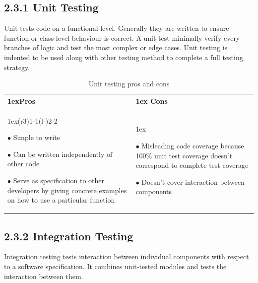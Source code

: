 \documentclass[12pt]{report}
\begin{document}
\subsection*{2.3.1 Unit Testing}
\par\noindent
Unit tests code on a functional-level. Generally they are written to ensure function or class-level behaviour is correct. A unit test minimally verify every branches of logic and test the most complex or edge cases. Unit testing is indented to be used along with other testing method to complete a full testing strategy.

\begin{table}[ht]
\begin{tabularx}{\linewidth}{>{\parskip1ex}X@{\kern4\tabcolsep}>{\parskip1ex}X}
\toprule
\hfil\bfseries Pros & \hfil\bfseries Cons
\\\cmidrule(r{3\tabcolsep}){1-1}\cmidrule(l{-\tabcolsep}){2-2}

$\bullet$ Simple to write\par
$\bullet$ Can be written independently of other code\par
$\bullet$ Serve as specification to other developers by giving concrete examples on how to use a particular function\par

&

$\bullet$ Misleading code coverage because 100\% unit test coverage doesn't correspond to complete test coverage \par
$\bullet$ Doesn't cover interaction between components \par

\\\bottomrule
\end{tabularx}
\caption{Unit testing pros and cons}
\end{table}
\vspace{-10pt}
\subsection*{2.3.2 Integration Testing}
\par\noindent
Integration testing tests interaction between individual components with respect to a software specification. It combines unit-tested modules and tests the interaction between them.
\end{document}
